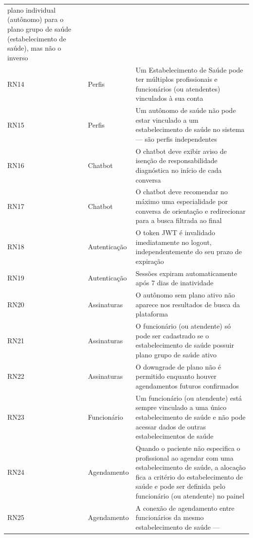 \begin{center}
\begin{longtable}{p{1.2cm}p{3cm}p{7.5cm}}
        plano individual (autônomo) para
        o plano grupo de saúde (estabelecimento de saúde),
        mas não o inverso \\
  RN14 & Perfis
      & Um Estabelecimento de Saúde pode ter múltiplos
        profissionais e funcionários
        (ou atendentes) vinculados
        à sua conta \\
  RN15 & Perfis
      & Um autônomo de saúde não pode estar
        vinculado a um estabelecimento de saúde no sistema
        --- são perfis independentes \\
  RN16 & Chatbot
      & O chatbot deve exibir aviso de
        isenção de responsabilidade
        diagnóstica no início de cada
        conversa \cite{cfm23362023,masanneck2024} \\
  RN17 & Chatbot
      & O chatbot deve recomendar no máximo
        uma especialidade por conversa de
        orientação e redirecionar para a busca
        filtrada ao final \cite{masanneck2024} \\
  RN18 & Autenticação
      & O token JWT é invalidado
        imediatamente no logout,
        independentemente do seu prazo
        de expiração \cite{rfc7519} \\
  RN19 & Autenticação
      & Sessões expiram automaticamente
        após 7 dias de inatividade \\
  RN20 & Assinaturas
      & O autônomo sem plano ativo não
        aparece nos resultados de busca
        da plataforma \\
  RN21 & Assinaturas
      & O funcionário (ou atendente) só
        pode ser cadastrado se o estabelecimento de saúde
        possuir plano grupo de saúde ativo \\
  RN22 & Assinaturas
      & O downgrade de plano não é
        permitido enquanto houver
        agendamentos futuros confirmados \\
  RN23 & Funcionário
      & Um funcionário (ou atendente) está
        sempre vinculado a uma único estabelecimento de saúde
        e não pode acessar dados de outras
        estabelecimentos de saúde \\
  RN24 & Agendamento
      & Quando o paciente não especifica o
        profissional ao agendar com uma
        estabelecimento de saúde, a alocação fica a critério
        do estabelecimento de saúde e pode ser definida pelo
        funcionário (ou atendente) no painel \\
  RN25 & Agendamento
      & A conexão de agendamento entre
        funcionários da mesmo estabelecimento de saúde ---

\end{longtable}
\end{center}
